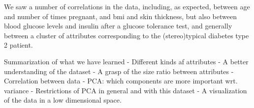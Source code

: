 We saw a number of correlations in the data,
including, as expected,
between age and number of times pregnant,
and bmi and skin thickness,
but also between blood glucose levels and insulin after a glucose tolerance test,
and generally between a cluster of attributes corresponding to
the (stereo)typical diabetes type 2 patient.


Summarization of what we have learned
- Different kinds af attributes
- A better understanding of the dataset
- A grasp of the size ratio between attributes
- Correlation between data
- PCA: which components are more important wrt. variance
- Restrictions of PCA in general and with this dataset
- A visualization of the data in a low dimensional space.
